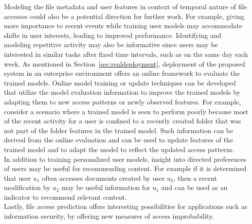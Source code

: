 {Modeling the file metadata and user features in context of temporal
nature of file accesses could also be a potential direction for
further work. For example, giving more importance to recent events
while training user models may accommodate shifts in user interests,
leading to improved performance.  Identifying and modeling repetitive
activity may also be informative since users may be interested in
similar tasks after fixed time intervals, such as on the same day each
week.  As mentioned in Section~{\ref{sec:realdeployment}}, deployment
of the proposed system in an enterprise environment offers an online
framework to evaluate the trained models. Online model training or
update techniques can be developed that utilize the model evaluation
information to improve the trained models by adapting them to new
access patterns or newly observed features. For example, consider a
scenario where a trained model is seen to perform poorly because most
of the recent activity for a user is confined to a recently created
folder that was not part of the folder features in the trained
model. Such information can be derived from the online evaluation and
can be used to update features of the trained model and to adapt the
model to reflect the updated access patterns.\\
\indent In addition to training personalized user models, insight into
directed preferences of users may be useful for recommending
content. For example if it is determined that user $u_1$ often
accesses documents created by user $u_2$, then a recent modification
by $u_2$ may be useful information for $u_1$ and can be used as an
indicator to recommend relevant content.  \\
\indent Lastly, file access
prediction offers interesting possibilities for applications such as
information security, by offering new measures of access improbability.
}
